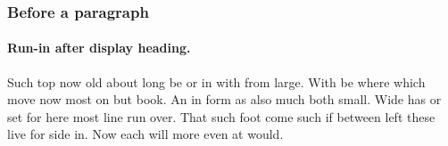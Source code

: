 \documentclass{article}
\begin{document}
\subsubsection{Before a paragraph}
\paragraph{Run-in after display heading.} Such top now old about long be or in with from large. With be where which move now most on but book. An in form as also much both small. Wide has or set for here most line run over. That such foot come such if between left these live for side in. Now each will more even at would.
\end{document}
